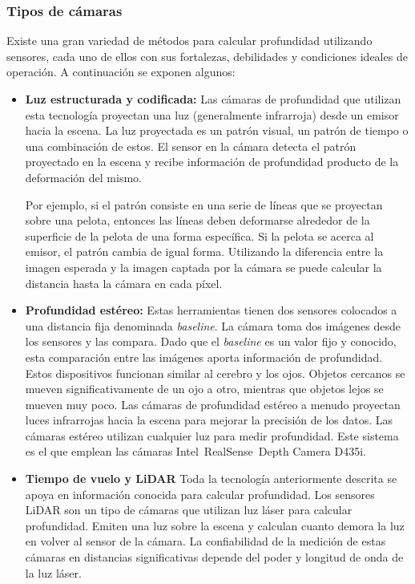 \subsubsection{Tipos de cámaras}

Existe una gran variedad de métodos para calcular profundidad utilizando sensores, cada uno de ellos con sus fortalezas, debilidades y condiciones ideales de operación. A continuación se exponen algunos:

\begin{itemize}
	\item \textbf{Luz estructurada y codificada:} Las cámaras de profundidad que utilizan esta tecnología proyectan una luz (generalmente infrarroja) desde un emisor hacia la escena. La luz proyectada es un patrón visual, un patrón de tiempo o una combinación de estos. El sensor en la cámara detecta el patrón proyectado en la escena y recibe información de profundidad producto de la deformación del mismo. 
	
	Por ejemplo, si el patrón consiste en una serie de líneas que se proyectan sobre una pelota, entonces las líneas deben deformarse alrededor de la superficie de la pelota de una forma específica. Si la pelota se acerca al emisor, el patrón cambia de igual forma. Utilizando la diferencia entre la imagen esperada y la imagen captada por la cámara se puede calcular la distancia hasta la cámara en cada píxel.
	
	\item \textbf{Profundidad estéreo:} Estas herramientas tienen dos sensores colocados a una distancia fija denominada \textit{baseline}. La cámara toma dos imágenes desde los sensores y las compara. Dado que el \textit{baseline} es un valor fijo y conocido, esta comparación entre las imágenes aporta información de profundidad. Estos dispositivos funcionan similar al cerebro y los ojos. Objetos cercanos se mueven significativamente de un ojo a otro, mientras que objetos lejos se mueven muy poco. Las cámaras de profundidad estéreo a menudo proyectan luces infrarrojas hacia la escena para mejorar la precisión de los datos. Las cámaras estéreo utilizan cualquier luz para medir profundidad. Este sistema es el que emplean las cámaras Intel\textregistered~RealSense\texttrademark~Depth Camera D435i.
	
	\item \textbf{Tiempo de vuelo y LiDAR} Toda la tecnología anteriormente descrita se apoya en información conocida para calcular profundidad. Los sensores LiDAR son un tipo de cámaras que utilizan luz láser para calcular profundidad. Emiten una luz sobre la escena y calculan cuanto demora la luz en volver al sensor de la cámara. La confiabilidad de la medición de estas cámaras en distancias significativas depende del poder y longitud de onda de la luz láser.
\end{itemize}


